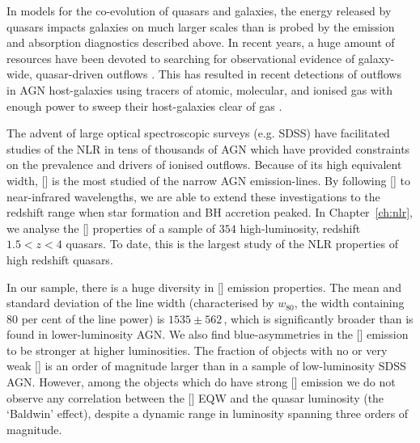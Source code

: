 In models for the co-evolution of quasars and galaxies, the energy released by quasars impacts galaxies on much larger scales than is probed by the emission and absorption diagnostics described above.  
In recent years, a huge amount of resources have been devoted to searching for observational evidence of galaxy-wide, quasar-driven outflows \citep[for recent reviews, see][]{alexander12,fabian12,heckman14}.
This has resulted in recent detections of outflows in AGN host-galaxies using tracers of atomic, molecular, and ionised gas with enough power to sweep their host-galaxies clear of gas \citep[e.g.][]{nesvadba06,arav08,nesvadba08,moe09,dunn10,alexander10,harrison12,harrison14,nesvadba10,rupke13,veilleux13,nardini15,feruglio10,alatalo11,cimatti13,cicone14}.  

The advent of large optical spectroscopic surveys (e.g. SDSS) have facilitated studies of the NLR in tens of thousands of AGN which have provided constraints on the prevalence and drivers of ionised outflows.  
Because of its high equivalent width, [] is the most studied of the narrow AGN emission-lines.  
By following [] to near-infrared wavelengths, we are able to extend these investigations to the redshift range when star formation and BH accretion peaked. 
In Chapter~\ref{ch:nlr}, we analyse the [] properties of a sample of $354$ high-luminosity, redshift $1.5 < z < 4$ quasars. 
To date, this is the largest study of the NLR properties of high redshift quasars. 

In our sample, there is a huge diversity in [] emission properties.
The mean and standard deviation of the line width (characterised by $w_{80}$, the width containing $80$ per cent of the line power) is $1535\pm562$\,\kms, which is significantly broader than is found in lower-luminosity AGN. 
We also find blue-asymmetries in the [] emission to be stronger at higher luminosities. 
The fraction of objects with no or very weak [] is an order of magnitude larger than in a sample of low-luminosity SDSS AGN.
However, among the objects which do have strong [] emission we do not observe any correlation between the [] EQW and the quasar luminosity (the `Baldwin' effect), despite a dynamic range in luminosity spanning three orders of magnitude. 

